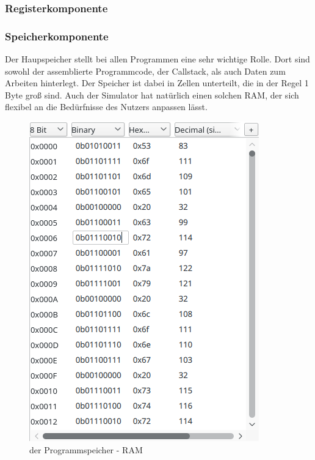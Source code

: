 \subsubsection{Registerkomponente}


\subsubsection{Speicherkomponente}
Der Haupspeicher stellt bei allen Programmen eine sehr wichtige Rolle. 
Dort sind sowohl der assemblierte Programmcode, der Callstack, als auch Daten zum Arbeiten hinterlegt.
Der Speicher ist dabei in Zellen unterteilt, die in der Regel 1 Byte groß sind.
Auch der Simulator hat natürlich einen solchen RAM, der sich flexibel an die Bedürfnisse des Nutzers anpassen lässt.

\begin{figure}[ht]
	\centering
  \includegraphics[scale=1]{Images/Memory}
	\caption{der Programmspeicher - RAM}
	\label{Memory}
\end{figure}


